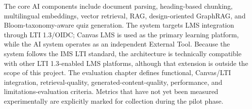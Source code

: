 The core AI components include document parsing, heading-based chunking,
multilingual embeddings, vector retrieval, RAG, design-oriented GraphRAG, and
Bloom-taxonomy-aware quiz generation. The system targets LMS integration
through LTI 1.3/OIDC; Canvas LMS is used as the primary learning platform,
while the AI system operates as an independent External Tool. Because the
system follows the IMS LTI standard, the architecture is technically
compatible with other LTI 1.3-enabled LMS platforms, although that extension is
outside the scope of this project. The evaluation chapter defines functional,
Canvas/LTI integration, retrieval-quality, generated-content-quality,
performance, and limitations-evaluation criteria. Metrics that have not yet
been measured experimentally are explicitly marked for collection during the
pilot phase.

\vspace{0.5cm}

